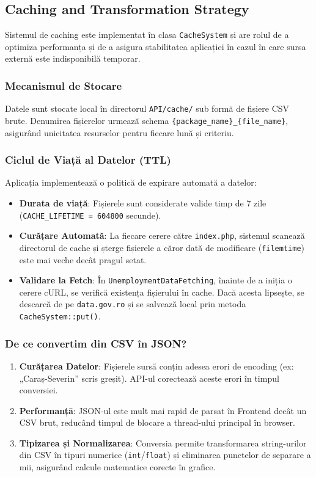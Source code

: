\documentclass[12pt,a4paper]{article}
\begin{document}
\subsection{Caching and Transformation Strategy}
Sistemul de caching este implementat în clasa \texttt{CacheSystem} și are rolul de a optimiza performanța și de a asigura stabilitatea aplicației în cazul în care sursa externă este indisponibilă temporar.

\subsubsection{Mecanismul de Stocare}
Datele sunt stocate local în directorul \texttt{API/cache/} sub formă de fișiere CSV brute. Denumirea fișierelor urmează schema \texttt{\{package\_name\}\_\{file\_name\}}, asigurând unicitatea resurselor pentru fiecare lună și criteriu.

\subsubsection{Ciclul de Viață al Datelor (TTL)}
Aplicația implementează o politică de expirare automată a datelor:
\begin{itemize}
    \item \textbf{Durata de viață}: Fișierele sunt considerate valide timp de 7 zile (\texttt{CACHE\_LIFETIME = 604800} secunde).
    \item \textbf{Curățare Automată}: La fiecare cerere către \texttt{index.php}, sistemul scanează directorul de cache și șterge fișierele a căror dată de modificare (\texttt{filemtime}) este mai veche decât pragul setat.
    \item \textbf{Validare la Fetch}: În \texttt{UnemploymentDataFetching}, înainte de a iniția o cerere cURL, se verifică existența fișierului în cache. Dacă acesta lipsește, se descarcă de pe \texttt{data.gov.ro} și se salvează local prin metoda \texttt{CacheSystem::put()}.
\end{itemize}

\subsubsection{De ce convertim din CSV în JSON?}
\begin{enumerate}
    \item \textbf{Curățarea Datelor}: Fișierele sursă conțin adesea erori de encoding (ex: „Caraș-Severin” scris greșit). API-ul corectează aceste erori în timpul conversiei.
    \item \textbf{Performanță}: JSON-ul este mult mai rapid de parsat în Frontend decât un CSV brut, reducând timpul de blocare a thread-ului principal în browser.
    \item \textbf{Tipizarea și Normalizarea}: Conversia permite transformarea string-urilor din CSV în tipuri numerice (\texttt{int}/\texttt{float}) și eliminarea punctelor de separare a mii, asigurând calcule matematice corecte în grafice.
\end{enumerate}
\end{document}
